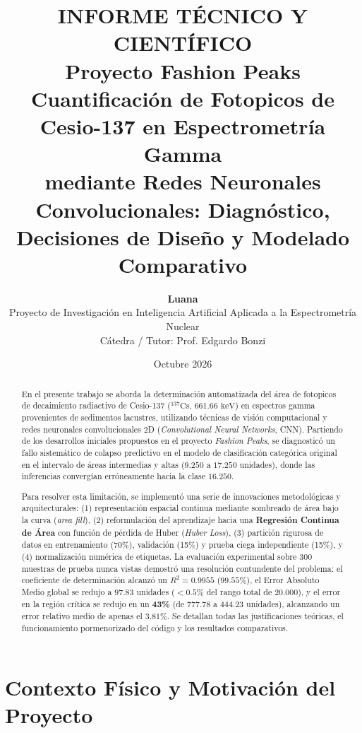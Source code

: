 \documentclass[11pt,a4paper]{article}
\title{
    \vspace{-1.5cm}
    \textbf{\Large INFORME TÉCNICO Y CIENTÍFICO} \\[0.3cm]
    \textbf{\huge Proyecto Fashion Peaks} \\[0.4cm]
    \large Cuantificación de Fotopicos de Cesio-137 en Espectrometría Gamma \\
    mediante Redes Neuronales Convolucionales: Diagnóstico, Decisiones de Diseño y Modelado Comparativo
}
\author{
    \textbf{Luana} \\
    \small Proyecto de Investigación en Inteligencia Artificial Aplicada a la Espectrometría Nuclear \\
    \small Cátedra / Tutor: Prof. Edgardo Bonzi
}
\date{Octubre 2026}
\begin{document}
\maketitle

\begin{abstract}
En el presente trabajo se aborda la determinación automatizada del área de fotopicos de decaimiento radiactivo de Cesio-137 ($^{137}\text{Cs}$, $661.66\text{ keV}$) en espectros gamma provenientes de sedimentos lacustres, utilizando técnicas de visión computacional y redes neuronales convolucionales 2D (\textit{Convolutional Neural Networks}, CNN). Partiendo de los desarrollos iniciales propuestos en el proyecto \textit{Fashion Peaks}, se diagnosticó un fallo sistemático de colapso predictivo en el modelo de clasificación categórica original en el intervalo de áreas intermedias y altas ($9.250$ a $17.250$ unidades), donde las inferencias convergían erróneamente hacia la clase $16.250$. 

Para resolver esta limitación, se implementó una serie de innovaciones metodológicas y arquitecturales: (1) representación espacial continua mediante sombreado de área bajo la curva (\textit{area fill}), (2) reformulación del aprendizaje hacia una \textbf{Regresión Continua de Área} con función de pérdida de Huber (\textit{Huber Loss}), (3) partición rigurosa de datos en entrenamiento (70\%), validación (15\%) y prueba ciega independiente (15\%), y (4) normalización numérica de etiquetas. La evaluación experimental sobre 300 muestras de prueba nunca vistas demostró una resolución contundente del problema: el coeficiente de determinación alcanzó un $R^2 = 0.9955$ ($99.55\%$), el Error Absoluto Medio global se redujo a $97.83$ unidades ($< 0.5\%$ del rango total de $20.000$), y el error en la región crítica se redujo en un \textbf{43\%} (de $777.78$ a $444.23$ unidades), alcanzando un error relativo medio de apenas el $3.81\%$. Se detallan todas las justificaciones teóricas, el funcionamiento pormenorizado del código y los resultados comparativos.
\end{abstract}

\tableofcontents
\newpage

\section{Contexto Físico y Motivación del Proyecto}
\end{document}
